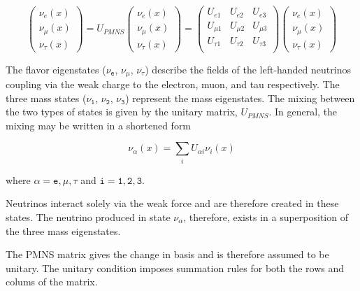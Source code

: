 \begin{equation}
\begin{pmatrix} \nu_e\left(x\right) \\ 	\nu_\mu\left(x\right) \\	\nu_\tau\left(x\right) \end{pmatrix} = 
U_{PMNS} \begin{pmatrix} \nu_e\left(x\right) \\ 	\nu_\mu\left(x\right) \\	\nu_\tau\left(x\right) \end{pmatrix} = 
\begin{pmatrix}
 U_{e 1} & U_{e 2} & U_{e 3} \\
 U_{\mu 1} & U_{\mu 2} & U_{\mu 3} \\
 U_{\tau 1} & U_{\tau 2} & U_{\tau 3} \\
\end{pmatrix} 	
\begin{pmatrix} \nu_e\left(x\right) \\ 	\nu_\mu\left(x\right) \\	\nu_\tau\left(x\right) \end{pmatrix}
\label{eqn:3flavor_pmns}
\end{equation}

The flavor eigenstates ($\mathtt{\nu_e}$, $\mathtt{\nu_\mu}$, $\mathtt{\nu_\tau}$) describe the fields of the left-handed neutrinos coupling via the weak charge to the electron, muon, and tau respectively.
The three mass states ($\mathtt{\nu_1}$, $\mathtt{\nu_2}$, $\mathtt{\nu_3}$) represent the mass eigenstates.
The mixing between the two types of states is given by the unitary matrix, $U_{PMNS}$.
In general, the mixing may be written in a shortened form

\begin{equation}
\nu_{\alpha}\left(x\right) = \sum_i U_{\alpha i} \nu_{i}\left(x\right)
\label{eqn:3flavor_short}
\end{equation}

where $\mathtt{\alpha=e,\mu,\tau}$ and $\mathtt{i=1,2,3}$. 

Neutrinos interact solely via the weak force and are therefore created in these states.
The neutrino produced in state $\nu_\alpha$, therefore, exists in a superposition of the three mass eigenstates.

The PMNS matrix gives the change in basis and is therefore assumed to be unitary.
The unitary condition imposes summation rules for both the rows and colums of the matrix.

